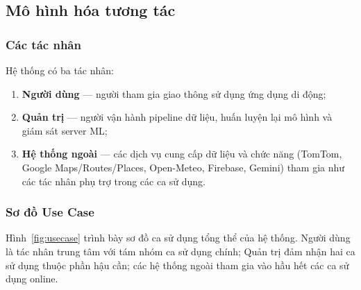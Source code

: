 \subsection{Mô hình hóa tương tác}
\subsubsection{Các tác nhân}
Hệ thống có ba tác nhân:
\begin{enumerate}[label=(\roman*),leftmargin=2.2cm,itemsep=2pt]
 \item \textbf{Người dùng} --- người tham gia giao thông sử dụng ứng dụng di động;
 \item \textbf{Quản trị} --- người vận hành pipeline dữ liệu, huấn luyện lại mô hình và giám sát server ML;
 \item \textbf{Hệ thống ngoài} --- các dịch vụ cung cấp dữ liệu và chức năng (TomTom, Google Maps/Routes/Places, Open-Meteo, Firebase, Gemini) tham gia như các tác nhân phụ trợ trong các ca sử dụng.
\end{enumerate}

\subsubsection{Sơ đồ Use Case}
Hình~\ref{fig:usecase} trình bày sơ đồ ca sử dụng tổng thể của hệ thống. Người dùng là tác nhân trung tâm với tám nhóm ca sử dụng chính; Quản trị đảm nhận hai ca sử dụng thuộc phần hậu cần; các hệ thống ngoài tham gia vào hầu hết các ca sử dụng online.

